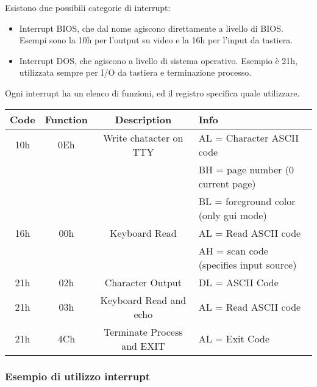 \documentclass[../template]{subfiles}
\begin{document}
Esistono due possibili categorie di interrupt:
\begin{itemize}
    \item Interrupt BIOS, che dal nome agiscono direttamente a livello di BIOS.
        Esempi sono la 10h per l'output su video e la 16h per l'input da tastiera.
    \item Interrupt DOS, che agiscono a livello di sistema operativo.
        Esempio è 21h, utilizzata sempre per I/O da tastiera e terminazione processo.
\end{itemize}
Ogni interrupt ha un elenco di funzioni, ed il registro \ah specifica quale utilizzare.

\begin{center}
\begin{tabu}{|c|c|c|l|}
    \hline
    Code & Function & Description & Info \\
    \hline
    10h & 0Eh &Write chatacter on TTY & AL = Character ASCII code\\
        & & & BH = page number (0 current page) \\
        & & & BL = foreground color (only gui mode)\\
    \hline
    16h & 00h & Keyboard Read & AL = Read ASCII code\\
        &     &               & AH = scan code (specifies input source)\\
    \hline
    21h & 02h & Character Output & DL = ASCII Code\\
    \hline
    21h & 03h & Keyboard Read and echo & AL = Read ASCII code\\
    \hline
    21h & 4Ch & Terminate Process and EXIT & AL = Exit Code\\
    \hline
\end{tabu}
\end{center}

\subsubsection{Esempio di utilizzo interrupt}

\end{document}
